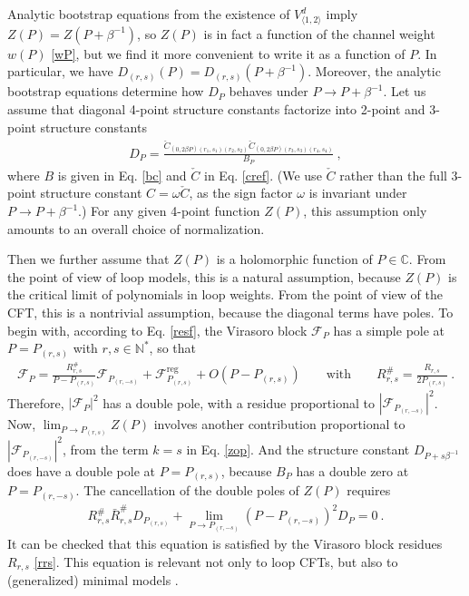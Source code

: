 \documentclass[12pt, a4paper]{article}
\begin{document}
Analytic bootstrap equations from the existence of $V^d_{\langle 1,2\rangle}$ imply $Z(P)=Z(P+\beta^{-1})$, so $Z(P)$ is in fact a function of the channel weight $w(P)$ \eqref{wP}, but we find it more convenient to write it as a function of $P$. In particular, we have $D_{(r,s)}(P)=D_{(r,s)}(P+\beta^{-1})$. Moreover, the analytic bootstrap equations 
determine how $D_P$ behaves under $P\to P+\beta^{-1}$. Let us assume that diagonal 4-point structure constants factorize into 2-point and 3-point structure constants
\begin{align}
 D_P = \frac{\check{C}_{(0,2\beta P)(r_1,s_1)(r_2,s_2)}\check{C}_{(0,2\beta P)(r_3,s_3)(r_4,s_4)}}{B_{P}}\ ,
 \label{dccb}
\end{align}
where $B$ is given in Eq. \eqref{bc} and $\check{C}$ in Eq. \eqref{cref}.
(We use $\check{C}$ rather than the full 3-point structure constant $C=\omega \check{C}$, as the sign factor $\omega$ is invariant under $P\to P+\beta^{-1}$.)
For any given 4-point function $Z(P)$, this assumption only amounts to an overall choice of normalization.

Then we further assume that $Z(P)$ is a holomorphic function of $P\in\mathbb{C}$. From the point of view of loop models, this is a natural assumption, because $Z(P)$ is the critical limit of polynomials in loop weights. From the point of view of the CFT, this is a nontrivial assumption, because the diagonal terms have poles.
To begin with, according to Eq. \eqref{resf}, the Virasoro block $\mathcal{F}_P$ has a simple pole at $P=P_{(r,s)}$ with $r,s\in \mathbb{N}^*$, so that 
\begin{align}
 \mathcal{F}_P = \frac{R^{\#}_{r,s}}{P-P_{(r,s)}} \mathcal{F}_{P_{(r,-s)}} + \mathcal{F}^\text{reg}_{P_{(r,s)}} + O(P-P_{(r,s)}) \qquad \text{with} \qquad R^{\#}_{r,s} = \frac{R_{r,s}}{2P_{(r,s)}}\ .
 \label{freg}
\end{align}
Therefore, $\left|\mathcal{F}_P\right|^2$ has a double pole, with a residue proportional to $\left|\mathcal{F}_{P_{(r,-s)}}\right|^2$. Now, $\lim_{P\to P_{(r,s)}} Z(P)$ involves another contribution proportional to $\left|\mathcal{F}_{P_{(r,-s)}}\right|^2$, from the term $k=s$ in Eq. \eqref{zop}. And the structure constant $D_{P+s\beta^{-1}}$ does have a double pole at $P=P_{(r,s)}$, because $B_P$ has a double zero at $P=P_{(r,-s)}$. The cancellation of the double poles of $Z(P)$ requires
\begin{align}
 R^{\#}_{r,s}\bar{R}^{\#}_{r,s}D_{P_{(r,s)}} + \lim_{P\to P_{(r,-s)}}\left(P-P_{(r,-s)}\right)^2 D_P = 0 \ .
 \label{dpld}
\end{align}
It can be checked that this equation is satisfied by the Virasoro block residues $R_{r,s}$ \eqref{rrs}. This equation is relevant not only to loop CFTs, but also to (generalized) minimal models \cite{rib18}.
\end{document}
